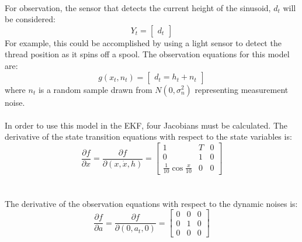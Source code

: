 \documentclass[12pt]{article}
\begin{document}
\\
For observation, the sensor that detects the current height of the sinusoid, $d_t$ will be considered:
\begin{equation}
Y_t = \begin{bmatrix}
d_t
\end{bmatrix}
\end{equation}
For example, this could be accomplished by using a light sensor to detect the thread position as it spins off a spool. The observation equations for this model are:
\begin{equation}
g(x_t,n_t) = \begin{bmatrix}
d_t = h_t + n_t
\end{bmatrix}
\end{equation}
where $n_t$ is a random sample drawn from $N(0,\sigma_n^2)$ representing measurement noise. \\
\\
In order to use this model in the EKF, four Jacobians must be calculated. The derivative of the state transition equations with respect to the state variables is: 
\begin{equation}
\frac{\partial f}{\partial x} =
\frac{\partial f}{\partial (x,\dot{x},h)} =
\begin{bmatrix}
1 & T & 0  \\
0 & 1 & 0  \\
\frac{1}{10} \cos \frac{x}{10} & 0 & 0 
\end{bmatrix}
\label{eq: Dfx}
\end{equation} \\
\\
The derivative of the observation equations with respect to the dynamic noises is:
\begin{equation}
\frac{\partial f}{\partial a} =
\frac{\partial f}{\partial (0,a_t,0)} =
\begin{bmatrix}
0 & 0 & 0  \\
0 & 1 & 0  \\
0 & 0 & 0 
\end{bmatrix} 
\label{eq: Dfa}
\end{equation}
\end{document}
